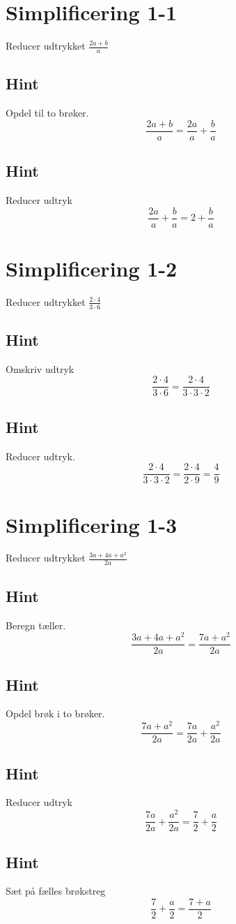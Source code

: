 \documentclass{article}
\newenvironment{exercise}[1]{\newpage\section{#1}}{}
\newcommand{\answerbox}[1]{\fbox{$#1$}}
\newcommand{\hint}{\subsection*{Hint}}
\begin{document}
\tableofcontents
\newpage

\begin{exercise}{Simplificering 1-1}

Reducer udtrykket $\frac{2a+b}{a}$

\answerbox{2 + \frac{b}{a}}

\hint

Opdel  til to brøker.
\[
\frac{2a+b}{a} = \frac{2a}{a} + \frac{b}{a}
\]

\hint

Reducer udtryk 
\[
\frac{2a}{a} + \frac{b}{a}  = 2 + \frac{b}{a}
\]

\end{exercise}

\newpage

\begin{exercise}{Simplificering 1-2}
	
	Reducer udtrykket $\frac{2 \cdot 4}{3 \cdot 6}$
	
	\answerbox{\frac{4}{9}}
	
	\hint
	
	Omskriv udtryk
	\[
	\frac{2 \cdot 4}{3 \cdot 6}  = \frac{2 \cdot 4}{3 \cdot 3 \cdot 2} 
	\]
	
	\hint
	
	Reducer udtryk.
	\[
	\frac{2 \cdot 4}{3 \cdot 3 \cdot 2}  = \frac{2 \cdot 4}{2 \cdot 9} = \frac{4}{9}
	\]
	
\end{exercise}

\newpage

\begin{exercise}{Simplificering 1-3}
	
	Reducer udtrykket $\frac{3a+4a+a^2}{2a}$
	
	\answerbox{\frac{7+a}{2}}
	
	\hint
	
	Beregn tæller.
	\[
	\frac{3a+4a+a^2}{2a} = \frac{7a+a^2}{2a}
	\]
	
	\hint
	
	Opdel brøk i to brøker.
	\[
	\frac{7a+a^2}{2a}  = \frac{7a}{2a} + \frac{a^2}{2a} 
	\]
	
	\hint
	
	Reducer udtryk
	\[
	\frac{7a}{2a} + \frac{a^2}{2a}  = \frac{7}{2} + \frac{a}{2}
	\]	 
	
	\hint
	
	Sæt på fælles brøkstreg
	\[
	\frac{7}{2} + \frac{a}{2} = \frac{7+a}{2} 
	\]
	
\end{exercise}
\end{document}
